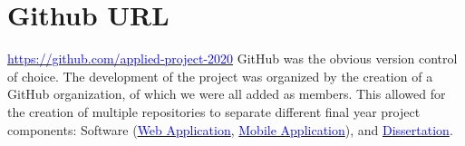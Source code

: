 \section{Github URL}
\href{https://github.com/applied-project-2020}{\textcolor{blue}{https://github.com/applied-project-2020}}
GitHub was the obvious version control of choice. The development of the project was organized by the creation of a GitHub organization, of which we were all added as members. This allowed for the creation of multiple repositories to separate different final year project components: Software (\href{https://github.com/applied-project-2020/zoosh}{\textcolor{blue}{Web Application}}, \href{https://github.com/applied-project-2020/mobile-application}{\textcolor{blue}{Mobile Application}}), and \href{https://github.com/applied-project-2020/documentation}{\textcolor{blue}{Dissertation}}.

